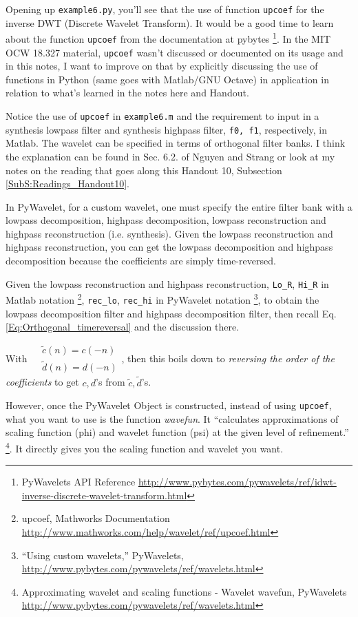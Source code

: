 \documentclass[twoside]{amsart}
\theoremstyle{plain}
\theoremstyle{definition}
\theoremstyle{remark}
\numberwithin{equation}{section}
\begin{document}
Opening up \verb|example6.py|, you'll see that the use of function \verb|upcoef| for the inverse DWT (Discrete Wavelet Transform).  It would be a good time to learn about the function \verb|upcoef| from the documentation at pybytes \footnote{PyWavelets API Reference \url{http://www.pybytes.com/pywavelets/ref/idwt-inverse-discrete-wavelet-transform.html}}.  In the MIT OCW 18.327 material, \verb|upcoef| wasn't discussed or documented on its usage and in this notes, I want to improve on that by explicitly discussing the use of functions in Python (same goes with Matlab/GNU Octave) in application in relation to what's learned in the notes here and Handout.  

Notice the use of \verb|upcoef| in \verb|example6.m| and the requirement to input in a synthesis lowpass filter and synthesis highpass filter, \verb|f0, f1|, respectively, in Matlab.  The wavelet can be specified in terms of orthogonal filter banks.  I think the explanation can be found in Sec. 6.2. of Nguyen and Strang \cite{GStrangTNguyen1996} or look at my notes on the reading that goes along this Handout 10, Subsection \ref{SubS:Readings_Handout10}.  

In PyWavelet, for a custom wavelet, one must specify the entire filter bank with a lowpass decomposition, highpass decomposition, lowpass reconstruction and highpass reconstruction (i.e. synthesis).  Given the lowpass reconstruction and highpass reconstruction, you can get the lowpass decomposition and highpass decomposition because the coefficients are simply time-reversed.  

Given the lowpass reconstruction and highpass reconstruction, \verb|Lo_R|, \verb|Hi_R| in Matlab notation 
\footnote{upcoef, Mathworks Documentation \url{http://www.mathworks.com/help/wavelet/ref/upcoef.html}}, \verb|rec_lo|, \verb|rec_hi| in PyWavelet notation 
\footnote{``Using custom wavelets,'' PyWavelets, \url{http://www.pybytes.com/pywavelets/ref/wavelets.html}}, to obtain the lowpass decomposition filter and highpass decomposition filter, then recall Eq. \ref{Eq:Orthogonal_timereversal} and the discussion there.  

With $\begin{aligned} & \widetilde{c}(n) = c(-n) \\
  & \widetilde{d}(n) = d(-n) \end{aligned}$, then this boils down to \emph{reversing the order of the coefficients} to get $c,d$'s from $\widetilde{c},\widetilde{d}$'s.  

However, once the PyWavelet Object is constructed, instead of using \verb|upcoef|, what you want to use is the function \emph{wavefun}.  It ``calculates approximations of scaling function (phi) and wavelet function (psi) at the given level of refinement.'' \footnote{Approximating wavelet and scaling functions - Wavelet wavefun, PyWavelets \url{http://www.pybytes.com/pywavelets/ref/wavelets.html}}. It directly gives you the scaling function and wavelet you want.  
\end{document}

